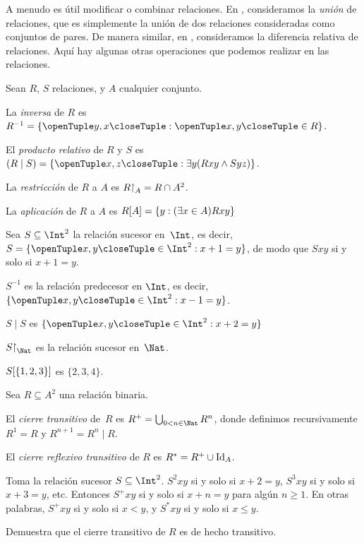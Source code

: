 \documentclass[../../../include/open-logic-section]{subfiles}
\begin{document}

A menudo es útil modificar o combinar relaciones. En , consideramos la \emph{unión} de relaciones, que es simplemente la unión de dos relaciones consideradas como conjuntos de pares. De manera similar, en , consideramos la diferencia relativa de relaciones. Aquí hay algunas otras operaciones que podemos realizar en las relaciones.

\begin{defn}
Sean $R$, $S$ relaciones, y $A$ cualquier conjunto.

La \emph{inversa} de $R$ es $R^{-1} = \Setabs{\tuple{y, x}}{\tuple{x, y} \in R}$.

El \emph{producto relativo} de $R$ y $S$ es $(R \mid S) = \{\tuple{x, z} : \exists y(Rxy \land Syz)\}$.

La \emph{restricción} de $R$ a $A$ es $R\mathord{\restriction}_{A}= R \cap A^2$.

La \emph{aplicación} de $R$ a $A$ es $R[A] = \{y : (\exists x \in A)Rxy\}$
\end{defn}

\begin{ex}
Sea $S \subseteq \Int^2$ la relación sucesor en~$\Int$, es decir, $S = \Setabs{\tuple{x, y} \in \Int^2}{x + 1 = y}$, de modo que $Sxy$ si y solo si $x + 1 = y$.

$S^{-1}$ es la relación predecesor en $\Int$, es decir, $\Setabs{\tuple{x,y}\in\Int^2}{x -1 =y}$.

$S\mid S$ es $\Setabs{\tuple{x,y}\in\Int^2}{x + 2 =y}$

$\funrestrictionto{S}{\Nat}$ es la relación sucesor en~$\Nat$.

$S[\{1,2,3\}]$ es $\{2, 3, 4\}$.
\end{ex}

\begin{defn}Sea $R \subseteq A^2$ una relación binaria.

El \emph{cierre transitivo} de~$R$ es $R^+ = \bigcup_{0 < n \in \Nat} R^n$, donde definimos recursivamente $R^1 = R$ y $R^{n+1} = R^n \mid R$.

El \emph{cierre reflexivo transitivo} de $R$ es $R^* = R^+ \cup \mathord{\mathrm{Id}_{A}}$.
\end{defn}

\begin{ex}
Toma la relación sucesor $S \subseteq \Int^2$. $S^2xy$ si y solo si $x + 2 = y$, $S^3xy$ si y solo si $x + 3 = y$, etc. Entonces $S^+xy$ si y solo si $x + n = y$ para algún $n \geq 1$. En otras palabras, $S^+xy$ si y solo si $x < y$, y $S^*xy$ si y solo si $x \le y$.
\end{ex}

\begin{prob}
Demuestra que el cierre transitivo de $R$ es de hecho transitivo.
\end{prob}
\end{document}
